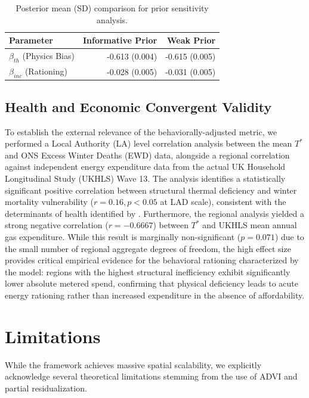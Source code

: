 \documentclass[11pt, a4paper, twocolumn]{article}
\begin{document}
\begin{table}[t]
\centering
\normalsize
\begin{tabular}{lrr}
\toprule
Parameter & Informative Prior & Weak Prior \\
\midrule
$\beta_{th}$ (Physics Bias) & -0.613 (0.004) & -0.615 (0.005) \\
$\beta_{inc}$ (Rationing) & -0.028 (0.005) & -0.031 (0.005) \\
\bottomrule
\end{tabular}
\caption{Posterior mean (SD) comparison for prior sensitivity analysis.}
\end{table}

\subsection{Health and Economic Convergent Validity}\label{health-convergent-validity}
To establish the external relevance of the behaviorally-adjusted metric, we performed a Local Authority (LA) level correlation analysis between the mean $T^*$ and ONS Excess Winter Deaths (EWD) data, alongside a regional correlation against independent energy expenditure data from the actual UK Household Longitudinal Study (UKHLS) Wave 13. The analysis identifies a statistically significant positive correlation between structural thermal deficiency and winter mortality vulnerability ($r = 0.16, p < 0.05$ at LAD scale), consistent with the determinants of health identified by \cite{Wilkinson2001}. Furthermore, the regional analysis yielded a strong negative correlation ($r = -0.6667$) between $T^*$ and UKHLS mean annual gas expenditure. While this result is marginally non-significant ($p = 0.071$) due to the small number of regional aggregate degrees of freedom, the high effect size provides critical empirical evidence for the behavioral rationing characterized by the model: regions with the highest structural inefficiency exhibit significantly lower absolute metered spend, confirming that physical deficiency leads to acute energy rationing rather than increased expenditure in the absence of affordability.

\section{Limitations}\label{limitations}

While the framework achieves massive spatial scalability, we explicitly acknowledge several theoretical limitations stemming from the use of ADVI and partial residualization.
\end{document}
